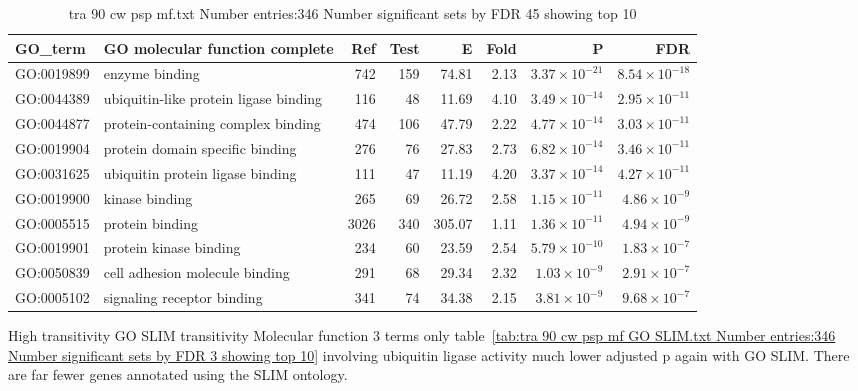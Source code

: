 \begin{table}[ht]
\centering
\begin{adjustbox}{width=\textwidth}
\begin{tabular}{llrrrrrr}
  \hline
GO\_term & GO molecular function complete & Ref & Test & E & Fold & P & FDR \\ 
  \hline
GO:0019899 & enzyme binding  & 742 & 159 & 74.81 & 2.13 & $3.37 \times 10^{-21}$ & $8.54 \times 10^{-18}$ \\ 
  GO:0044389 & ubiquitin-like protein ligase binding  & 116 & 48 & 11.69 & 4.10 & $3.49 \times 10^{-14}$ & $2.95 \times 10^{-11}$ \\ 
  GO:0044877 & protein-containing complex binding  & 474 & 106 & 47.79 & 2.22 & $4.77 \times 10^{-14}$ & $3.03 \times 10^{-11}$ \\ 
  GO:0019904 & protein domain specific binding  & 276 & 76 & 27.83 & 2.73 & $6.82 \times 10^{-14}$ & $3.46 \times 10^{-11}$ \\ 
  GO:0031625 & ubiquitin protein ligase binding  & 111 & 47 & 11.19 & 4.20 & $3.37 \times 10^{-14}$ & $4.27 \times 10^{-11}$ \\ 
  GO:0019900 & kinase binding  & 265 & 69 & 26.72 & 2.58 & $1.15 \times 10^{-11}$ & $4.86 \times 10^{-9}$ \\ 
  GO:0005515 & protein binding  & 3026 & 340 & 305.07 & 1.11 & $1.36 \times 10^{-11}$ & $4.94 \times 10^{-9}$ \\ 
  GO:0019901 & protein kinase binding  & 234 & 60 & 23.59 & 2.54 & $5.79 \times 10^{-10}$ & $1.83 \times 10^{-7}$ \\ 
  GO:0050839 & cell adhesion molecule binding  & 291 & 68 & 29.34 & 2.32 & $1.03 \times 10^{-9}$ & $2.91 \times 10^{-7}$ \\ 
  GO:0005102 & signaling receptor binding  & 341 & 74 & 34.38 & 2.15 & $3.81 \times 10^{-9}$ & $9.68 \times 10^{-7}$ \\ 
  \hline
\end{tabular}
\end{adjustbox}
\caption{tra 90 cw psp mf.txt Number entries:346 Number significant sets by FDR 45 showing top 10} 
\label{tab:tra 90 cw psp mf.txt Number entries:346 Number significant sets by FDR 45 showing top 10}
\end{table}

High transitivity GO SLIM transitivity Molecular function 3 terms only table~\ref{tab:tra 90 cw psp mf GO SLIM.txt Number entries:346 Number significant sets by FDR 3 showing top 10} involving ubiquitin ligase activity much lower adjusted p again with GO SLIM. There are far fewer genes annotated using the SLIM ontology. 

